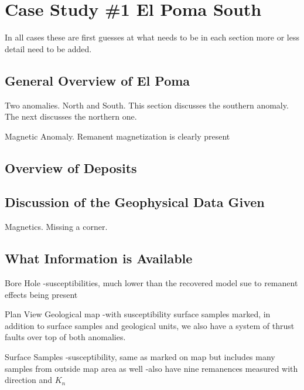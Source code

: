 
\chapter{Case Study \#1 El Poma South}
\label{ch:CaseStudy1}

In all cases these are first guesses at what needs to be in each section more or less detail need to be added.

\section{General Overview of El Poma}
\label{sec:General Over View of El Poma}

Two anomalies. North and South. This section discusses the southern anomaly. The next discusses the northern one. 

Magnetic Anomaly. Remanent magnetization is clearly present

\section{Overview of Deposits}
\label{sec:Overview of Deposits:ElPoma1}

\section{Discussion of the Geophysical Data Given}
\label{sec:Discussion of the Geophysical Data Given:ElPoma1}

Magnetics. Missing a corner.

\section{What Information is Available}
\label{sec:What Information is Available:ElPoma1}

Bore Hole
-susceptibilities, much lower than the recovered model sue to remanent effects being present

Plan View Geological map
-with susceptibility surface samples marked, in addition to surface samples and geological units, we also have a system of thrust faults over top of both anomalies.

Surface Samples
-susceptibility, same as marked on map but includes many samples from outside map area as well
-also have nine remanences measured with direction and $K_n$

